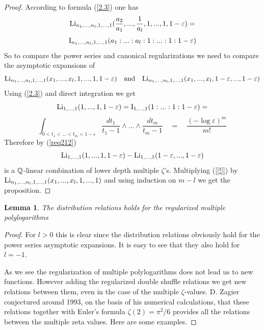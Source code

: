 \documentclass[10pt]{article}
\newtheorem{lemma}[theorem]{Lemma}
\begin{document}
\begin{proof} 
According to formula (\ref{2.3}) one has 
\begin{equation} \label{ol2}
{\rm Li}_{n_1,...,n_l, 1 , ... , 1}(\frac{a_2}{a_1}, ... , \frac{1}{a_{l}},1, ... , 1,1- \varepsilon) = 
\end{equation}
$$
{\rm I}_{n_1,...,n_l, 1 , ... , 1}(a_1: ... : a_l:1: ... : 1:1- \varepsilon)
$$
 So to compare the power series and canonical regularizations we 
need to compare the asymptotic expansions of  
$$
{\rm Li}_{n_1,...,n_l, 1 , ... , 1}(x_1, ... , x_l,1, ... , 1,1- \varepsilon) \quad \mbox{and} \quad 
{\rm Li}_{n_1,...,n_l, 1 , ... , 1}(x_1, ... , x_l,1- \varepsilon , ... , 1- \varepsilon)
 $$ 
Using (\ref{2.3}) and direct integration we get     
$$
{\rm Li}_{1,...,1}(  1, ..., 1, 1- \varepsilon) = {\rm I}_{ 1, ...,1}(  1 : ... :1:1- \varepsilon) = 
$$
$$  
     \int_{0 < t_1 < ... < t_m < 1 - \varepsilon } \frac{dt_1}{t_1-1}
      \wedge ... \wedge \frac{dt_m}{t_m-1} \quad = \quad
     \frac{(- \log \varepsilon)^m }{m!} 
$$  
Therefore by (\ref{req212}) 
\begin{equation} \label{[!]}
 {\rm Li}_{1,...,1}(  1, ..., 1, 1- \varepsilon) - {\rm Li}_{1,...,1}(  1- \varepsilon, ..., 1- \varepsilon) 
\end{equation}
is a ${\mathbb Q}$-linear combination of lower depth multiple $\zeta$'s. Multiplying 
(\ref{[!]}) by ${\rm Li}_{n_1,...,n_l, 1 , ... , 1}(x_1, ... , x_l,1, ... , 1)$ and using induction on $m-l$ 
we get the proposition. 
   

\end{proof}

\begin{lemma} \label{DRc}
The distribution relations holds for the regularized multiple polylogarithms
\end{lemma}

\begin{proof} For $l>0$ this is clear since the distribution relations obviously hold for the power series asymptotic expansions. It is easy to see that they also hold for $l= -1$.  
 
  
As we see the regularization of multiple
  polylogarithms does not lead us to new functions. However 
adding the regularized double shuffle relations we get new relations between 
them, even in the case of
  the multiple $\zeta$-values. D. Zagier 
 conjectured around 1993,  on the basis of his numerical calculations, 
that these relations together with Euler's formula $\zeta(2) = \pi^2/6$ 
provides all the relations between the multiple zeta values.  
Here are some examples.






\end{proof}
\end{document}
